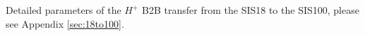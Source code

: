Detailed parameters of the $H^{+}$ B2B transfer from the SIS18 to the SIS100, please see Appendix \ref{sec:18to100}.

%
%
